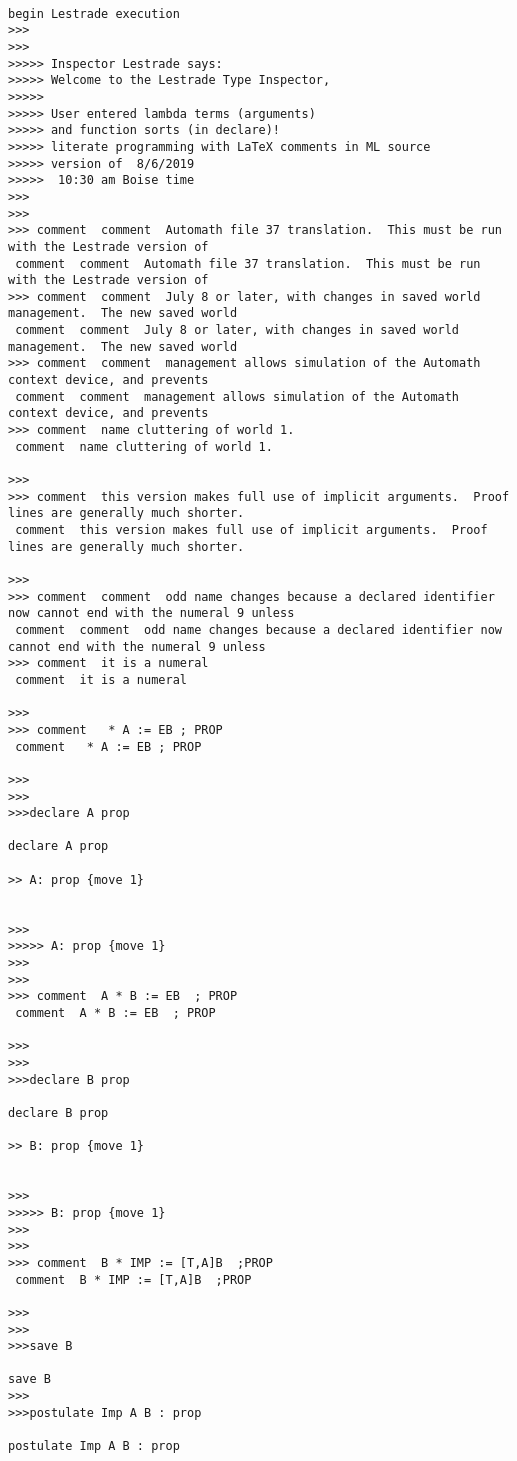 \documentclass{article}
\begin{document}
\begin{verbatim}

begin Lestrade execution
>>>
>>>
>>>>> Inspector Lestrade says:  
>>>>> Welcome to the Lestrade Type Inspector,
>>>>>  
>>>>> User entered lambda terms (arguments)
>>>>> and function sorts (in declare)!
>>>>> literate programming with LaTeX comments in ML source
>>>>> version of  8/6/2019
>>>>>  10:30 am Boise time
>>>
>>>
>>> comment  comment  Automath file 37 translation.  This must be run with the Lestrade version of
 comment  comment  Automath file 37 translation.  This must be run with the Lestrade version of
>>> comment  comment  July 8 or later, with changes in saved world management.  The new saved world
 comment  comment  July 8 or later, with changes in saved world management.  The new saved world
>>> comment  comment  management allows simulation of the Automath context device, and prevents
 comment  comment  management allows simulation of the Automath context device, and prevents
>>> comment  name cluttering of world 1.
 comment  name cluttering of world 1.

>>>
>>> comment  this version makes full use of implicit arguments.  Proof lines are generally much shorter.
 comment  this version makes full use of implicit arguments.  Proof lines are generally much shorter.

>>>
>>> comment  comment  odd name changes because a declared identifier now cannot end with the numeral 9 unless
 comment  comment  odd name changes because a declared identifier now cannot end with the numeral 9 unless
>>> comment  it is a numeral
 comment  it is a numeral

>>>
>>> comment   * A := EB ; PROP
 comment   * A := EB ; PROP

>>>
>>>
>>>declare A prop

declare A prop

>> A: prop {move 1}


>>>
>>>>> A: prop {move 1}
>>>
>>>
>>> comment  A * B := EB  ; PROP
 comment  A * B := EB  ; PROP

>>>
>>>
>>>declare B prop

declare B prop

>> B: prop {move 1}


>>>
>>>>> B: prop {move 1}
>>>
>>>
>>> comment  B * IMP := [T,A]B  ;PROP
 comment  B * IMP := [T,A]B  ;PROP

>>>
>>>
>>>save B

save B
>>>
>>>postulate Imp A B : prop

postulate Imp A B : prop


\end{verbatim}
\end{document}
